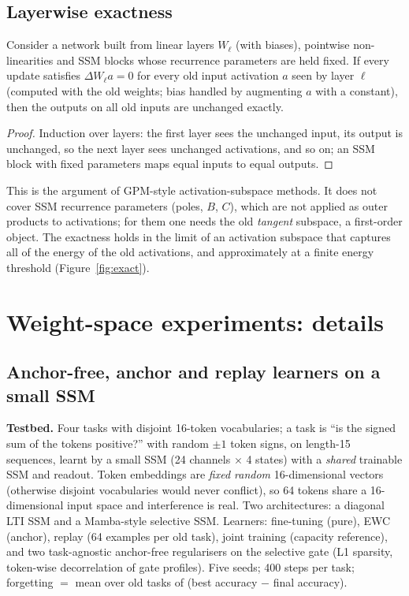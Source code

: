 \subsection{Layerwise exactness}
\begin{proposition}\label{prop:layer}
Consider a network built from linear layers $W_\ell$ (with biases), pointwise non-linearities and SSM blocks whose recurrence parameters are held fixed. If every update satisfies $\Delta W_\ell a=0$ for every old input activation $a$ seen by layer $\ell$ (computed with the old weights; bias handled by augmenting $a$ with a constant), then the outputs on all old inputs are unchanged exactly.
\end{proposition}
\begin{proof}
Induction over layers: the first layer sees the unchanged input, its output is unchanged, so the next layer sees unchanged activations, and so on; an SSM block with fixed parameters maps equal inputs to equal outputs.
\end{proof}
This is the argument of GPM-style activation-subspace methods. It does not cover SSM recurrence parameters (poles, $B$, $C$), which are not applied as outer products to activations; for them one needs the old \emph{tangent} subspace, a first-order object. The exactness holds in the limit of an activation subspace that captures all of the energy of the old activations, and approximately at a finite energy threshold (Figure~\ref{fig:exact}).

\section{Weight-space experiments: details}\label{app:weightexp}
\subsection{Anchor-free, anchor and replay learners on a small SSM}
\textbf{Testbed.} Four tasks with disjoint 16-token vocabularies; a task is ``is the signed sum of the tokens positive?'' with random $\pm1$ token signs, on length-15 sequences, learnt by a small SSM (24 channels $\times$ 4 states) with a \emph{shared} trainable SSM and readout. Token embeddings are \emph{fixed random} 16-dimensional vectors (otherwise disjoint vocabularies would never conflict), so 64 tokens share a 16-dimensional input space and interference is real. Two architectures: a diagonal LTI SSM and a Mamba-style selective SSM. Learners: fine-tuning (pure), EWC (anchor), replay (64 examples per old task), joint training (capacity reference), and two task-agnostic anchor-free regularisers on the selective gate (L1 sparsity, token-wise decorrelation of gate profiles). Five seeds; 400 steps per task; forgetting $=$ mean over old tasks of (best accuracy $-$ final accuracy).

